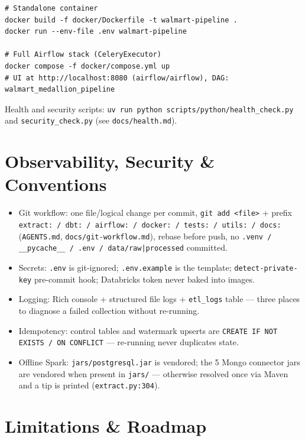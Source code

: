 \documentclass[11pt,a4paper]{article}
\begin{document}
\begin{lstlisting}[style=bash,caption={Docker \& Airflow}]
# Standalone container
docker build -f docker/Dockerfile -t walmart-pipeline .
docker run --env-file .env walmart-pipeline

# Full Airflow stack (CeleryExecutor)
docker compose -f docker/compose.yml up
# UI at http://localhost:8080 (airflow/airflow), DAG: walmart_medallion_pipeline
\end{lstlisting}

Health and security scripts: \texttt{uv run python scripts/python/health\_check.py} and \texttt{security\_check.py} (see \texttt{docs/health.md}).

\section{Observability, Security \& Conventions}

\begin{itemize}[leftmargin=1.4em]
  \item Git workflow: one file/logical change per commit, \texttt{git add <file>} + prefix \texttt{extract: / dbt: / airflow: / docker: / tests: / utils: / docs:} (\texttt{AGENTS.md}, \texttt{docs/git-workflow.md}), rebase before push, no \texttt{.venv / \_\_pycache\_\_ / .env / data/raw|processed} committed.
  \item Secrets: \texttt{.env} is git-ignored; \texttt{.env.example} is the template; \texttt{detect-private-key} pre-commit hook; Databricks token never baked into images.
  \item Logging: Rich console + structured file logs + \texttt{etl\_logs} table — three places to diagnose a failed collection without re-running.
  \item Idempotency: control tables and watermark upserts are \texttt{CREATE IF NOT EXISTS / ON CONFLICT} — re-running never duplicates state.
  \item Offline Spark: \texttt{jars/postgresql.jar} is vendored; the 5 Mongo connector jars are vendored when present in \texttt{jars/} — otherwise resolved once via Maven and a tip is printed (\texttt{extract.py:304}).
\end{itemize}

\section{Limitations \& Roadmap}
\end{document}
